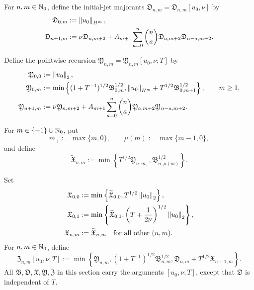 \begin{definition}
For \(n,m\in\mathbb N_0\), define the initial-jet majorants
\(\mathfrak D_{n,m}=\mathfrak D_{n,m}[u_0,\nu]\) by
\begin{align}
 \mathfrak D_{0,m}&:=\left\lVert u_0\right\rVert_{H^m},
 \label{eq:qc-D0}\\
 \mathfrak D_{n+1,m}
 &:=\nu\mathfrak D_{n,m+2}
 +A_{m+1}\sum_{a=0}^{n}\binom na
   \mathfrak D_{a,m+2}\mathfrak D_{n-a,m+2}.
 \label{eq:qc-Drec}
\end{align}
\begin{samepage}
Define the pointwise recursion
\(\mathfrak Y_{n,m}=\mathfrak Y_{n,m}[u_0,\nu;T]\) by
\begin{align}
 \mathfrak Y_{0,0}&:=\left\lVert u_0\right\rVert_2,
 \label{eq:qc-Y00}\\
 \mathfrak Y_{0,m}
 &:=\min\left\{
 (1+T^{-1})^{1/2}\mathfrak B_{0,m}^{1/2},
 \left\lVert u_0\right\rVert_{H^m}+T^{1/2}\mathfrak B_{0,m+1}^{1/2}
 \right\},
 \qquad m\ge1,
 \label{eq:qc-Y0}\\
 \mathfrak Y_{n+1,m}
 &:=\nu\mathfrak Y_{n,m+2}
 +A_{m+1}\sum_{a=0}^{n}\binom na
 \mathfrak Y_{a,m+2}\mathfrak Y_{n-a,m+2}.
 \label{eq:qc-Yrec}
\end{align}
\end{samepage}
\begin{samepage}
For \(m\in\{-1\}\cup\mathbb N_0\), put
\[
 m_+:=\max\{m,0\},
 \qquad
 \mu(m):=\max\{m-1,0\},
\]
and define
\begin{equation}
 \widetilde{\mathfrak X}_{n,m}
 :=\min\left\{
 T^{1/2}\mathfrak Y_{n,m_+},
 \mathfrak B_{n,\mu(m)}^{1/2}
 \right\}.
 \label{eq:qc-Xraw}
\end{equation}
\end{samepage}
Set
\begin{align}
 \mathfrak X_{0,0}
 &:=\min\left\{\widetilde{\mathfrak X}_{0,0},
 T^{1/2}\left\lVert u_0\right\rVert_2\right\},
 \label{eq:qc-X00}\\
 \mathfrak X_{0,1}
 &:=\min\left\{\widetilde{\mathfrak X}_{0,1},
 \left(T+\frac1{2\nu}\right)^{1/2}\left\lVert u_0\right\rVert_2\right\},
 \label{eq:qc-X01}\\
 \mathfrak X_{n,m}&:=\widetilde{\mathfrak X}_{n,m}
 \quad\text{for all other }(n,m).
 \label{eq:qc-Xotherwise}
\end{align}
For \(n,m\in\mathbb N_0\), define
\begin{equation}
 \mathfrak Z_{n,m}[u_0,\nu;T]
 :=\min\left\{
 \mathfrak Y_{n,m},
 (1+T^{-1})^{1/2}\mathfrak B_{n,m}^{1/2},
 \mathfrak D_{n,m}+T^{1/2}\mathfrak X_{n+1,m}
 \right\}.
 \label{eq:qc-Z}
\end{equation}
All \(\mathfrak B,\mathfrak D,\mathfrak X,\mathfrak Y,\mathfrak Z\) in
this section carry the arguments \([u_0,\nu;T]\), except that
\(\mathfrak D\) is independent of \(T\).
\end{definition}

